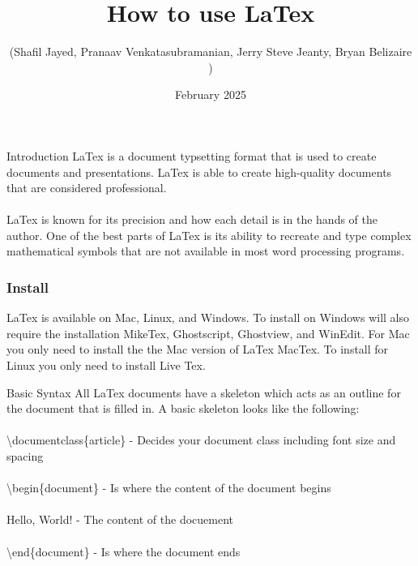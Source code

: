 \documentclass[aspectratio=1610]{beamer}
\title{How to use LaTex}
\date{February 2025}
\author{ (Shafil Jayed, Pranaav Venkatasubramanian, Jerry Steve Jeanty, Bryan Belizaire )}
\begin{document}
\begin{frame} 
\titlepage
\end{frame}


\begin{frame}{Introduction}
    LaTex is a document typsetting format that is used to create documents and presentations. LaTex is able to create high-quality documents that are considered professional. 
    \\ ~ \\
    LaTex is known for its precision and how each detail is in the hands of the author. One of the best parts of LaTex is its ability to recreate and type complex mathematical symbols that are not available in most word processing programs. 
\end{frame}

\begin{frame}
    \frametitle{Install}
        LaTex is available on Mac, Linux, and Windows. To install on Windows will also require the installation MikeTex, Ghostscript, Ghostview, and WinEdit. For Mac you only need to install the the Mac version of LaTex MacTex. To install for Linux you only need to install Live Tex.
        


\end{frame}

\begin{frame}{Basic Syntax}
    All LaTex documents have a skeleton which acts as an outline for the document that is filled in.  A basic skeleton looks like the following: 
    \\ ~ \\
\textbackslash{}documentclass\{article\}  - Decides your document class including font size and spacing
    \\ ~ \\
\textbackslash{}begin\{document\} - Is where the content of the document begins
    \\ ~ \\
Hello, World! - The content of the docuement
    \\ ~ \\
\textbackslash{}end\{document\} - Is where the document ends
    
\end{frame}
\end{document}
